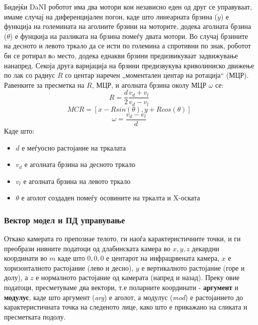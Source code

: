 \documentclass[12pt]{article}
\begin{document}
      Бидејќи DaNI роботот има два мотори кои независно еден од друг се управуваат, имаме случај на диференцијален погон, каде што линеарната брзина ($\dot y$) е функција на големината на аголните брзини на моторите, додека аголната брзина ($\dot \theta$) е фунцкија на разликата на брзина помеѓу двата мотори. Во случај брзините на десното и левото тркало да се исти по големина а спротивни по знак, роботот би се ротирал вo место, додека еднакви брзини предизвикуваат задвижување нанапред. Секоја друга варијација на брзини предизвукува криволиниско движење по лак со радиус $R$ со центар наречен „моментален центар на ротација“ (МЦР). Равенките за пресметка на $R$, МЦР, и аголната брзина околу МЦР $\omega$ се:
      $$ R = \frac{d}{2} \frac{v_d + v_l}{v_d - v_l} $$
      $$ {MCR} = [x - Rsin(\theta), y + Rcos(\theta)] $$
      $$ \omega = \frac{v_d - v_l}{d} $$
      Каде што:
      \begin{itemize}
        \item $d$ е меѓуосно растојание на тркалата
        \item $v_d$ е аголната брзина на десното тркало
        \item $v_l$ е аголната брзина на левото тркало
        \item $\theta$ е аголот создаден помеѓу осовините на тркалта и X-оската
      \end{itemize}

    \subsubsection{Вектор модел и ПД управување}

      Откако камерата го препознае телото, ги наоѓа карактеристичните точки, и ги преобрази нивните податоци од длабинската камера во $ x,y,z $ декардни координати во $ m $ каде што $ 0,0,0 $ е центарот на инфрацрвената камера, $x$ е хоризонталното растојание (лево и десно), $y$ е вертикалното растојание (горе и долу), а $z$ е нормалното растојание од камерата (напред и назад). Преку овие податоци, пресметуваме два вектори, т.е поларните координати - \textbf{аргумент} и \textbf{модулус}, каде што аргумент (\textit{arg}) е аголот, а модулус (\textit{mod}) е растојанието до карактеристичната точка на следеното лице, како што е прикажано на сликата и пресметката подолу.
\end{document}
